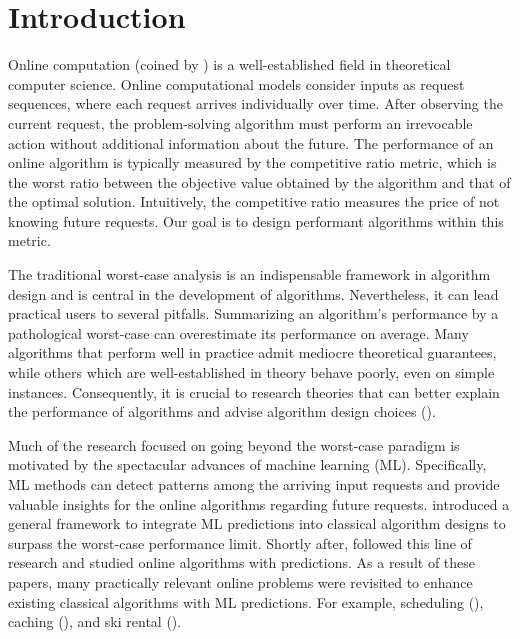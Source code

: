 
\section{Introduction}

Online computation (coined by \cite{BorodinEl-Yaniv05:Online-computation}) is a well-established field in theoretical computer science. Online computational models consider inputs as request sequences, where each request arrives individually over time. After observing the current request, the problem-solving algorithm must perform an irrevocable action without additional information about the future. The performance of an online algorithm is typically measured by the competitive ratio metric, which is the worst ratio between the objective value obtained by the algorithm and that of the optimal solution. Intuitively, the competitive ratio measures the price of not knowing future requests. Our goal is to design performant algorithms within this metric.

The traditional worst-case analysis is an indispensable framework in algorithm design and is central in the development of algorithms. Nevertheless, it can lead practical users to several pitfalls. Summarizing an algorithm's performance by a pathological worst-case can overestimate its performance on average. Many algorithms that perform well in practice admit mediocre theoretical guarantees, while others which are well-established in theory behave poorly, even on simple instances. Consequently, it is crucial to research theories that can better explain the performance of algorithms and advise algorithm design choices (\cite{Roughgarden19:Beyond-worst-case,Roughgarden20:Beyond-the-Worst-Case}).

Much of the research focused on going beyond the worst-case paradigm is motivated by the spectacular advances of machine learning (ML). Specifically, ML methods can detect patterns among the arriving input requests and provide valuable insights for the online algorithms regarding future requests. \cite{LykourisVassilvtiskii18:Competitive-caching} introduced a general framework to integrate ML predictions into classical algorithm designs to surpass the worst-case performance limit.
Shortly after, \cite{MitzenmacherVassilvitskii20:Beyond-the-Worst-Case}
followed this line of research and studied online algorithms with predictions. As a result of these papers, many practically relevant online problems were revisited to enhance existing classical algorithms with ML predictions. For example, scheduling (\cite{LattanziLavastida20:Online-scheduling,Mitzenmacher20:Scheduling-with}), caching (\cite{LykourisVassilvtiskii18:Competitive-caching,Rohatgi20:Near-optimal-bounds,AntoniadisCoester20:Online-metric}), and ski rental (\cite{GollapudiPanigrahi19:Online-algorithms,KumarPurohit18:Improving-online}).

